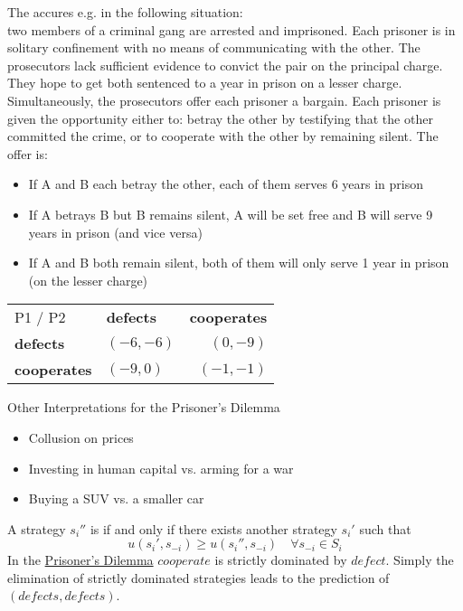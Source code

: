 \begin{example} \label{prisonersdilemma}
The  accures e.g. in the following situation: \\
	 two members of a criminal gang are arrested and imprisoned. Each prisoner is in solitary confinement with no means of communicating with the other. The prosecutors lack sufficient evidence to convict the pair on the principal charge. They hope to get both sentenced to a year in prison on a lesser charge. Simultaneously, the prosecutors offer each prisoner a bargain. Each prisoner is given the opportunity either to: betray the other by testifying that the other committed the crime, or to cooperate with the other by remaining silent. The offer is:
	\begin{itemize}
		\item If A and B each betray the other, each of them serves 6 years in prison
		\item If A betrays B but B remains silent, A will be set free and B will serve 9 years in prison (and vice versa)
		\item If A and B both remain silent, both of them will only serve 1 year in prison (on the lesser charge)
	\end{itemize}
	
\begin{center}
	\begin{tabular}{|l|l|r|}
		\hline\hline
  			P1 / P2 & \textbf{defects} & \textbf{cooperates} \\
         		\cline{1-3}
   			\textbf{defects} & $(-6, -6)$ & $(0, -9)$ 	\arrayrulewidth2pt \\
            	\cline{1-3}
   			\textbf{cooperates} & $(-9, 0)$ & $(-1, -1)$ \\ \hline\hline
	\end{tabular}	
\end{center}


	Other Interpretations for the Prisoner's Dilemma
	\begin{itemize}
		\item Collusion on prices
		\item Investing in human capital vs. arming for a war
		\item Buying a SUV vs. a smaller car
	\end{itemize}
\end{example}

\begin{definition}
	A strategy $s_{i}''$ is  if and only if there exists another strategy $s_{i}'$ such that
	\[ u(s_{i}', s_{-i}) \geq u(s_{i}'', s_{-i}) \quad \forall s_{-i} \in S_{i} \]	
	In the \hyperref[prisonersdilemma]{Prisoner's Dilemma} $cooperate$ is strictly dominated by $defect$. Simply the elimination of strictly dominated strategies leads to the prediction of $(defects, defects)$.
\end{definition}

